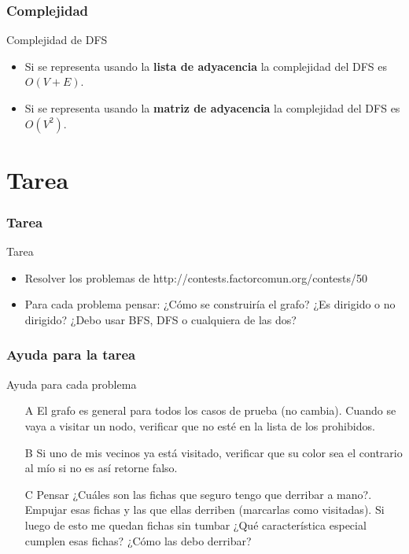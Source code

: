 \documentclass{beamer}
\begin{document}
	\begin{frame}
		\frametitle{Complejidad}
		\begin{block}{Complejidad de DFS}
			\begin{itemize}
				\item Si se representa usando la \textbf{lista de adyacencia} la complejidad del DFS es $O(V+E)$.
				\item Si se representa usando la \textbf{matriz de adyacencia} la complejidad del DFS es $O(V^2)$.
			\end{itemize}
		\end{block}
	\end{frame}

\section{Tarea}
	\begin{frame}
		\frametitle{Tarea}
		\begin{alertblock}{Tarea}
			\begin{itemize}
				\item Resolver los problemas de http://contests.factorcomun.org/contests/50 \\
				\item Para cada problema pensar: ¿Cómo se construiría el grafo? ¿Es dirigido o no dirigido? ¿Debo usar BFS, DFS o cualquiera de las dos?
			\end{itemize}
		\end{alertblock}
	\end{frame}
	
	\begin{frame}
		\frametitle{Ayuda para la tarea}
		\begin{exampleblock}{Ayuda para cada problema}
			\begin{itemize}
				\item[A] El grafo es general para todos los casos de prueba (no cambia). Cuando se vaya a visitar un nodo, verificar que no esté en la lista de los prohibidos.
				\item[B] Si uno de mis vecinos ya está visitado, verificar que su color sea el contrario al mío si no es así retorne falso.
				\item[C] Pensar ¿Cuáles son las fichas que seguro tengo que derribar a mano?. Empujar esas fichas y las que ellas derriben (marcarlas como visitadas). Si luego de esto me quedan fichas sin tumbar ¿Qué característica especial cumplen esas fichas? ¿Cómo las debo derribar?
			\end{itemize}
		\end{exampleblock}
	\end{frame}
	
\end{document}
